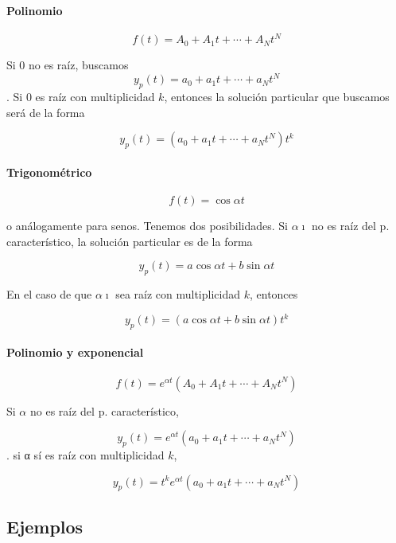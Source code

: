 \documentclass[nochap]{apuntes}
\renewcommand{\i}{\imath}
\begin{document}
\paragraph{Polinomio}

\[ f(t) = A_0 + A_1t + \dotsb + A_Nt^N \]

Si $0$ no es raíz, buscamos \[y_p(t) = a_0 + a_1t + \dotsb + a_Nt^N\]. Si $0$ es raíz con multiplicidad $k$, entonces la solución particular que buscamos será de la forma

\[ y_p(t) =( a_0 + a_1t + \dotsb + a_Nt^N)t^k \]

\paragraph{Trigonométrico} 

\[ f(t) = \cos αt \]

o análogamente para senos. Tenemos dos posibilidades. Si $α\i$ no es raíz del p. característico, la solución particular es de la forma

\[ y_p(t) = a\cos αt + b\sin αt \]

En el caso de que $α\imath$ sea raíz con multiplicidad $k$, entonces

\[ y_p(t) = (a\cos αt + b\sin αt)t^k \]

\paragraph{Polinomio y exponencial}

\[ f(t) = e^{αt}(A_0 + A_1t + \dotsb + A_Nt^N) \]

Si $α$ no es raíz del p. característico,

\[ y_p(t) = e^{αt}(a_0 + a_1t + \dotsb + a_Nt^N) \]. si α sí es raíz con multiplicidad $k$,

\[ y_p(t) = t^ke^{αt}(a_0 + a_1t + \dotsb + a_Nt^N) \]

\subsection{Ejemplos}
\end{document}

